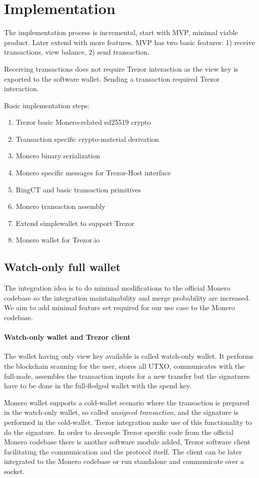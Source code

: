 \documentclass[]{article}
\begin{document}
\section{Implementation}

The implementation process is incremental, start with MVP, minimal viable product. Later extend with more features. MVP has two basic features: 1) receive transactions, view balance, 2) send transaction. 

Receiving transactions does not require Trezor interaction as the view key is exported to the software wallet. Sending a transaction required Trezor interaction.

\;
\noindent Basic implementation steps:
\begin{enumerate}
	\item Trezor basic Monero-related ed25519 crypto
	\item Transaction specific crypto-material derivation
	\item Monero binary serialization
	\item Monero specific messages for Trezor-Host interface
	\item RingCT and basic transaction primitives
	\item Monero transaction assembly
	\item Extend simplewallet to support Trezor
	\item Monero wallet for Trezor.io 
\end{enumerate}

\subsection{Watch-only full wallet}
The integration idea is to do minimal modifications to the official Monero codebase so the integration maintainability and merge probability are increased. We aim to add minimal feature set required for our use case to the Monero codebase. 

\paragraph{Watch-only wallet and Trezor client} 
The wallet having only view key available is called watch-only wallet. It performs the blockchain scanning for the user, stores all UTXO, communicates with the full-node, assembles the transaction inputs for a new transfer but the signatures have to be done in the full-fledged wallet with the spend key. 

Monero wallet supports a cold-wallet scenario where the transaction is prepared in the watch-only wallet, so called \emph{unsigned transaction}, and the signature is performed in the cold-wallet. Trezor integration make use of this functionality to do the signature. In order to decouple Trezor specific code from the official Monero codebase there is another software module added, Trezor software client facilitating the communication and the protocol itself. The client can be later integrated to the Monero codebase or run standalone and communicate over a socket.
\end{document}
